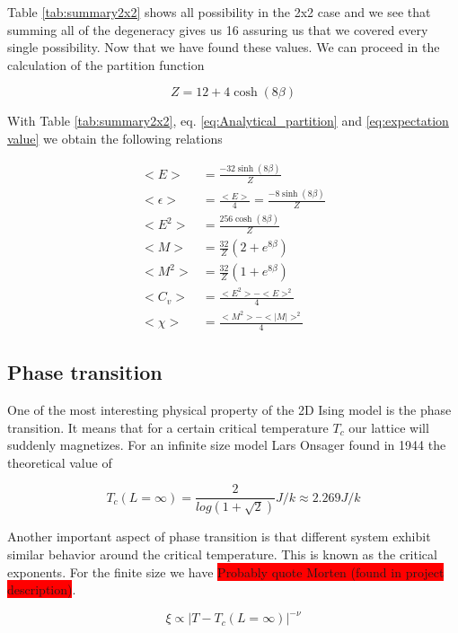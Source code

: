 \documentclass[english,notitlepage,reprint,nofootinbib]{revtex4-2}  %
\begin{document}
	Table \ref{tab:summary2x2} shows all possibility in the 2x2 case and we see that summing all
	of the degeneracy gives us 16 assuring us that we covered every single possibility. Now that
	we have found these values. We can proceed in the calculation of the partition function
	
	\begin{equation}
		Z = 12 + 4\cosh(8\beta) \label{eq:Analytical_partition} 
	\end{equation}	

	
	With Table \ref{tab:summary2x2}, eq. \ref{eq:Analytical_partition} and \ref{eq:expectation value} we obtain the following relations 
	
	\begin{align*} \label{eq:sol}
		<E> &= \frac{-32\sinh(8\beta)}{Z}  \\
		<\epsilon> &= \frac{<E>}{4} = \frac{-8\sinh(8\beta)}{Z} \\
		<E^2> &= \frac{256 \cosh(8\beta)}{Z} \\
		<M> &= \frac{32}{Z} (2 + e^{8\beta}) \\
		<M^2> &= \frac{32}{Z} (1 + e^{8\beta}) \\
		<C_v> &= \frac{<E^2> - <E>^2}{4} \\
		<\chi> &=  \frac{<M^2> - <|M|>^2}{4}
	\end{align*}
	
	
	\subsection{Phase transition}\label{subsec:phase transition}
	One of the most interesting physical property of the 2D Ising model is the phase transition.
	It means that for a certain critical temperature $T_c$ our lattice will suddenly magnetizes. For an infinite size model Lars Onsager found in 1944 the theoretical value of 
	
	\begin{equation}
		T_c(L=\infty)=\frac{2}{log(1 + \sqrt{2})} J/k \approx 2.269 J/k \label{Tc_theo}
	\end{equation}
	
	Another important aspect of phase transition is that different system exhibit similar 
	behavior around the critical temperature. This is known as the critical exponents. For the 
	finite size we have \colorbox{red}{Probably quote Morten (found in project description)}. 
	
	\begin{equation}
		\xi \propto |T - T_c(L=\infty)|^{-\nu} \label{eq:critical exponent}
	\end{equation}
	
\end{document}
